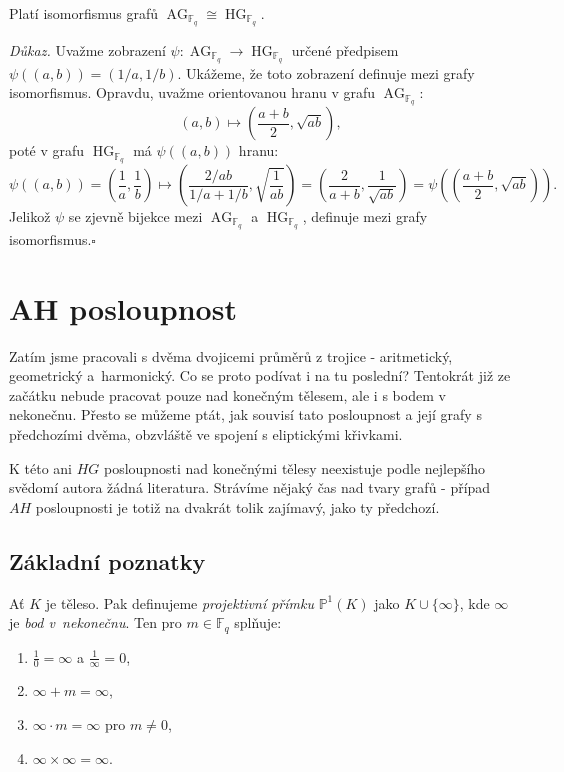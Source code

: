 \documentclass[12pt]{report}
\DeclareMathOperator{\AG}{AG}
\DeclareMathOperator{\HG}{HG}
\begin{document}
\begin{veta}
Platí isomorfismus grafů $\AG_{\mathbb{F}_q} \cong \HG_{\mathbb{F}_q}$.
\end{veta}
\noindent \textit{Důkaz.} Uvažme zobrazení $\psi : \AG_{\mathbb{F}_q} \longrightarrow \HG_{\mathbb{F}_q}$ určené předpisem $\psi((a,b)) = (1/a,1/b)$. Ukážeme, že toto zobrazení definuje mezi grafy isomorfismus. Opravdu, uvažme orientovanou hranu v grafu $\AG_{\mathbb{F}_q}$: 
$$(a,b) \longmapsto \left(\frac{a+b}{2}, \sqrt{ab} \right),$$
poté v grafu $\HG_{\mathbb{F}_q}$ má $\psi((a,b))$ hranu:
$$\psi ((a,b)) = \left(\frac{1}{a}, \frac{1}{b} \right) \longmapsto \left(\frac{2/ab}{1/a+1/b}, \sqrt{\frac{1}{ab}} \right) = \left( \frac{2}{a+b}, \frac{1}{\sqrt{ab}} \right) = \psi \left( \left( \frac{a+b}{2}, \sqrt{ab} \right) \right).$$
Jelikož $\psi$ se zjevně bijekce mezi $\AG_{\mathbb{F}_q}$ a $\HG_{\mathbb{F}_q}$, definuje mezi grafy isomorfismus.\hfill $\square$\\


\chapter{AH posloupnost}\label{AH}
Zatím jsme pracovali s dvěma dvojicemi průměrů z trojice - aritmetický, geometrický a~harmonický. Co se proto podívat i na tu poslední? Tentokrát již ze začátku nebude pracovat pouze nad konečným tělesem, ale i s bodem v nekonečnu. Přesto se můžeme ptát, jak souvisí tato posloupnost a její grafy s předchozími dvěma, obzvláště ve spojení s eliptickými křivkami.

K této ani $HG$ posloupnosti nad konečnými tělesy neexistuje podle nejlepšího svědomí autora žádná literatura. Strávíme nějaký čas nad tvary grafů - případ $AH$ posloupnosti je totiž na dvakrát tolik zajímavý, jako ty předchozí.

\section{Základní poznatky}



\begin{definice}
Ať $K$ je těleso. Pak definujeme \textit{projektivní přímku} $\mathbb{P}^{1} (K)$ jako $K \cup \lbrace \infty \rbrace$, kde $\infty$ je \textit{bod v~nekonečnu}. Ten pro $m \in \mathbb{F}_q$ splňuje:
\begin{enumerate}
\item $\frac{1}{0} = \infty$ a $\frac{1}{\infty} = 0$,
\item $\infty+m = \infty$,
\item $\infty \cdot m = \infty$ pro $m \neq 0$,
\item $\infty \times \infty = \infty$.
\end{enumerate}
\end{definice}
\end{document}
